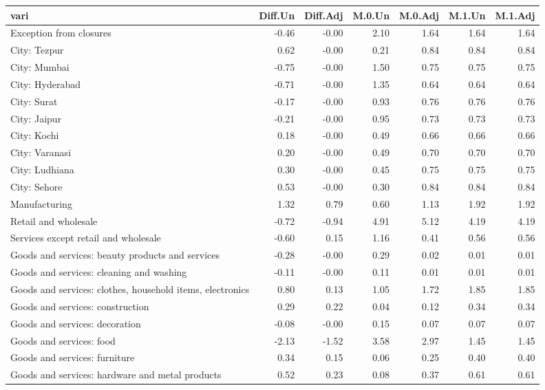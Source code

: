 \begin{longtable}{lrrrrrr}
  \hline
vari & Diff.Un & Diff.Adj & M.0.Un & M.0.Adj & M.1.Un & M.1.Adj \\ 
  \hline
Exception from closures & -0.46 & -0.00 & 2.10 & 1.64 & 1.64 & 1.64 \\ 
  City: Tezpur & 0.62 & -0.00 & 0.21 & 0.84 & 0.84 & 0.84 \\ 
  City: Mumbai & -0.75 & -0.00 & 1.50 & 0.75 & 0.75 & 0.75 \\ 
  City: Hyderabad & -0.71 & -0.00 & 1.35 & 0.64 & 0.64 & 0.64 \\ 
  City: Surat & -0.17 & -0.00 & 0.93 & 0.76 & 0.76 & 0.76 \\ 
  City: Jaipur & -0.21 & -0.00 & 0.95 & 0.73 & 0.73 & 0.73 \\ 
  City: Kochi & 0.18 & -0.00 & 0.49 & 0.66 & 0.66 & 0.66 \\ 
  City: Varanasi & 0.20 & -0.00 & 0.49 & 0.70 & 0.70 & 0.70 \\ 
  City: Ludhiana & 0.30 & -0.00 & 0.45 & 0.75 & 0.75 & 0.75 \\ 
  City: Sehore & 0.53 & -0.00 & 0.30 & 0.84 & 0.84 & 0.84 \\ 
  Manufacturing & 1.32 & 0.79 & 0.60 & 1.13 & 1.92 & 1.92 \\ 
  Retail and wholesale & -0.72 & -0.94 & 4.91 & 5.12 & 4.19 & 4.19 \\ 
  Services except retail and wholesale & -0.60 & 0.15 & 1.16 & 0.41 & 0.56 & 0.56 \\ 
  Goods and services: beauty products and services & -0.28 & -0.00 & 0.29 & 0.02 & 0.01 & 0.01 \\ 
  Goods and services: cleaning and washing & -0.11 & -0.00 & 0.11 & 0.01 & 0.01 & 0.01 \\ 
  Goods and services: clothes, household items, electronics & 0.80 & 0.13 & 1.05 & 1.72 & 1.85 & 1.85 \\ 
  Goods and services: construction & 0.29 & 0.22 & 0.04 & 0.12 & 0.34 & 0.34 \\ 
  Goods and services: decoration & -0.08 & -0.00 & 0.15 & 0.07 & 0.07 & 0.07 \\ 
  Goods and services: food & -2.13 & -1.52 & 3.58 & 2.97 & 1.45 & 1.45 \\ 
  Goods and services: furniture & 0.34 & 0.15 & 0.06 & 0.25 & 0.40 & 0.40 \\ 
  Goods and services: hardware and metal products & 0.52 & 0.23 & 0.08 & 0.37 & 0.61 & 0.61 \\ 

\end{longtable}
